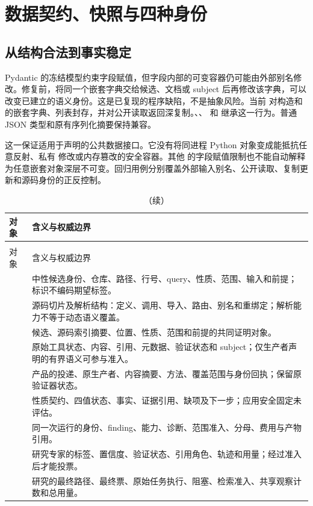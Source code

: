 \section{数据契约、快照与四种身份}
\label{sec:identity}
\subsection{从结构合法到事实稳定}
Pydantic 的冻结模型约束字段赋值，但字段内部的可变容器仍可能由外部别名修改。修复前，将同一个嵌套字典交给候选、文档或 subject 后再修改该字典，可以改变已建立的语义身份。这是已复现的程序缺陷，不是抽象风险。当前  对构造和  的嵌套字典、列表封存，并对公开读取返回深复制。、、 和  继承这一行为。普通 JSON 类型和原有序列化摘要保持兼容。

这一保证适用于声明的公共数据接口。它没有将同进程 Python 对象变成能抵抗任意反射、私有  修改或内存篡改的安全容器。其他  的字段赋值限制也不能自动解释为任意嵌套对象深层不可变。回归用例分别覆盖外部输入别名、公开读取、复制更新和源码身份的正反控制。

\begin{longtable}{L{38mm}L{111mm}}
\caption{跨研究与产品路径的核心数据对象。}\\
\toprule 对象 & 含义与权威边界\\\midrule\endfirsthead
\caption[]{（续）}\\
\toprule 对象 & 含义与权威边界\\\midrule\endhead
{} & 中性候选身份、仓库、路径、行号、query、性质、范围、输入和前提；标识不编码期望标签。\\
 & 源码切片及解析结构：定义、调用、导入、路由、别名和重绑定；解析能力不等于动态语义覆盖。\\
 & 候选、源码索引摘要、位置、性质、范围和前提的共同证明对象。\\
 & 原始工具状态、内容、引用、元数据、验证状态和 subject；仅生产者声明的有界语义可参与准入。\\
 & 产品的投递、原生产者、内容摘要、方法、覆盖范围与身份回执；保留原验证器状态。\\
 & 性质契约、四值状态、事实、证据引用、缺项及下一步；应用安全固定未评估。\\
 & 同一次运行的身份、finding、能力、诊断、范围准入、分母、费用与产物引用。\\
 & 研究专家的标签、置信度、验证状态、引用角色、轨迹和用量；经过准入后才能投票。\\
 & 研究的最终路径、最终票、原始任务执行、阻塞、检索准入、共享观察计数和总用量。\\
\bottomrule
\end{longtable}

